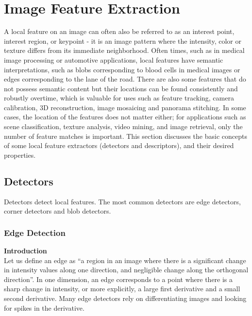 \documentclass[twoside]{article}
\begin{document}



\section{Image Feature Extraction}

A local feature on an image can often also be referred to as an interest point, interest region, or keypoint - it is an image pattern where the intensity, color or texture differs from its immediate neighborhood. Often times, such as in medical image processing or automotive applications, local features have semantic interpretations, such as blobs corresponding to blood cells in medical images or edges corresponding to the lane of the road. There are also some features that do not possess semantic content but their locations can be found consistently and robustly overtime, which is valuable for uses such as feature tracking, camera calibration, 3D reconstruction, image mosaicing and panorama stitching. In some cases, the location of the features does not matter either; for applications such as scene classification, texture analysis, video mining, and image retrieval, only the number of feature matches is important. This section discusses the basic concepts of some local feature extractors (detectors and descriptors), and their desired properties.

\subsection{Detectors}
Detectors detect local features. The most common detectors are edge detectors, corner detectors and blob detectors.
\subsubsection{Edge Detection}
\textbf{Introduction}\\
Let us define an edge as ``a region in an image where there is a significant change in intensity values along one direction, and negligible change along the orthogonal direction''. In one dimension, an edge corresponds to a point where there is a sharp change in intensity, or more explicitly, a large first derivative and a small second derivative. Many edge detectors rely on differentiating images and looking for spikes in the derivative.
\end{document}
